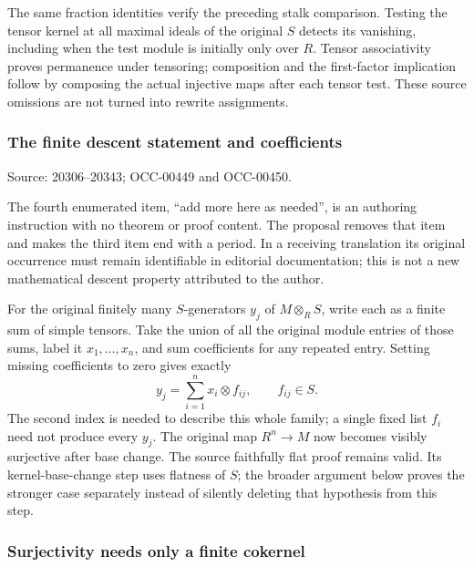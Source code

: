 The same fraction identities verify the preceding stalk comparison. Testing the tensor kernel at all maximal ideals of the original \(S\) detects its vanishing, including when the test module is initially only over \(R\). Tensor associativity proves permanence under tensoring; composition and the first-factor implication follow by composing the actual injective maps after each tensor test. These source omissions are not turned into rewrite assignments.

\subsubsection{The finite descent statement and coefficients}\label{algebra-proof-010-the-finite-descent-statement-and-coefficients}

Source: 20306--20343; OCC-00449 and OCC-00450.

The fourth enumerated item, ``add more here as needed'', is an authoring instruction with no theorem or proof content. The proposal removes that item and makes the third item end with a period. In a receiving translation its original occurrence must remain identifiable in editorial documentation; this is not a new mathematical descent property attributed to the author.

For the original finitely many \(S\)-generators \(y_j\) of \(M\otimes_RS\), write each as a finite sum of simple tensors. Take the union of all the original module entries of those sums, label it \(x_1,\ldots,x_n\), and sum coefficients for any repeated entry. Setting missing coefficients to zero gives exactly \[
y_j=\sum_{i=1}^n x_i\otimes f_{ij},\qquad f_{ij}\in S.
\] The second index is needed to describe this whole family; a single fixed list \(f_i\) need not produce every \(y_j\). The original map \(R^n\to M\) now becomes visibly surjective after base change. The source faithfully flat proof remains valid. Its kernel-base-change step uses flatness of \(S\); the broader argument below proves the stronger case separately instead of silently deleting that hypothesis from this step.

\subsubsection{Surjectivity needs only a finite cokernel}\label{algebra-proof-010-surjectivity-needs-only-a-finite-cokernel}

